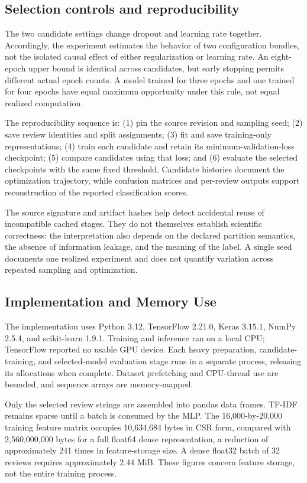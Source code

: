 \subsection{Selection controls and reproducibility}
The two candidate settings change dropout and learning rate together. Accordingly, the experiment estimates the behavior of two configuration bundles, not the isolated causal effect of either regularization or learning rate. An eight-epoch upper bound is identical across candidates, but early stopping permits different actual epoch counts. A model trained for three epochs and one trained for four epochs have equal maximum opportunity under this rule, not equal realized computation.

The reproducibility sequence is: (1) pin the source revision and sampling seed; (2) save review identities and split assignments; (3) fit and save training-only representations; (4) train each candidate and retain its minimum-validation-loss checkpoint; (5) compare candidates using that loss; and (6) evaluate the selected checkpoints with the same fixed threshold. Candidate histories document the optimization trajectory, while confusion matrices and per-review outputs support reconstruction of the reported classification scores.

The source signature and artifact hashes help detect accidental reuse of incompatible cached stages. They do not themselves establish scientific correctness: the interpretation also depends on the declared partition semantics, the absence of information leakage, and the meaning of the label. A single seed documents one realized experiment and does not quantify variation across repeated sampling and optimization.


\subsection{Implementation and Memory Use}
The implementation uses Python 3.12, TensorFlow 2.21.0, Keras 3.15.1, NumPy 2.5.4, and scikit-learn 1.9.1. Training and inference ran on a local CPU; TensorFlow reported no usable GPU device. Each heavy preparation, candidate-training, and selected-model evaluation stage runs in a separate process, releasing its allocations when complete. Dataset prefetching and CPU-thread use are bounded, and sequence arrays are memory-mapped.

Only the selected review strings are assembled into pandas data frames. TF-IDF remains sparse until a batch is consumed by the MLP. The 16,000-by-20,000 training feature matrix occupies 10,634,684 bytes in CSR form, compared with 2,560,000,000 bytes for a full float64 dense representation, a reduction of approximately 241 times in feature-storage size. A dense float32 batch of 32 reviews requires approximately 2.44 MiB. These figures concern feature storage, not the entire training process.

